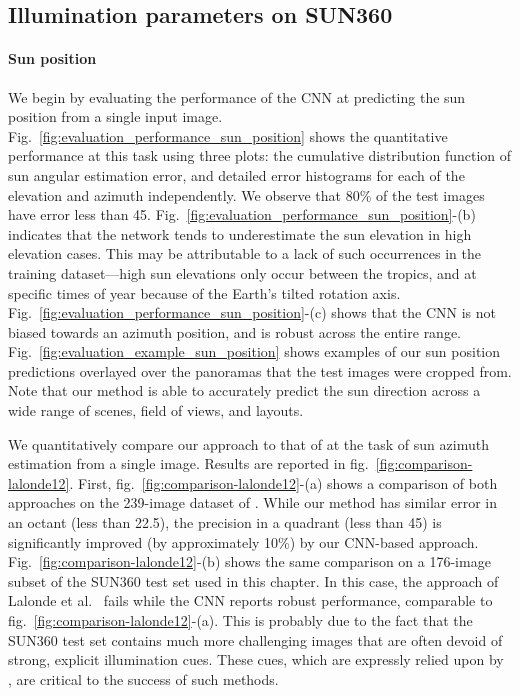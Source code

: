 \subsection{Illumination parameters on SUN360}

\paragraph{Sun position}

We begin by evaluating the performance of the CNN at predicting the sun position from a single input image. Fig.~\ref{fig:evaluation_performance_sun_position} shows the quantitative performance at this task using three plots: the cumulative distribution function of sun angular estimation error, and detailed error histograms for each of the elevation and azimuth independently. We observe that 80\% of the test images have error less than 45\degree. Fig.~\ref{fig:evaluation_performance_sun_position}-(b) indicates that the network tends to underestimate the sun elevation in high elevation cases. This may be attributable to a lack of such occurrences in the training dataset---high sun elevations only occur between the tropics, and at specific times of year because of the Earth's tilted rotation axis. Fig.~\ref{fig:evaluation_performance_sun_position}-(c) shows that the CNN is not biased towards an azimuth position, and is robust across the entire range. Fig.~\ref{fig:evaluation_example_sun_position} shows examples of our sun position predictions overlayed over the panoramas that the test images were cropped from. Note that our method is able to accurately predict the sun direction across a wide range of scenes, field of views, and layouts.

We quantitatively compare our approach to that of \cite{lalonde-ijcv-12} at the task of sun azimuth estimation from a single image. Results are reported in fig.~\ref{fig:comparison-lalonde12}. First, fig.~\ref{fig:comparison-lalonde12}-(a) shows a comparison of both approaches on the 239-image dataset of \cite{lalonde-ijcv-12}. While our method has similar error in an octant (less than 22.5\degree), the precision in a quadrant (less than 45\degree) is significantly improved (by approximately 10\%) by our CNN-based approach. Fig.~\ref{fig:comparison-lalonde12}-(b) shows the same comparison on a 176-image subset of the SUN360 test set used in this chapter. In this case, the approach of Lalonde et al.~\cite{lalonde-ijcv-12} fails while the CNN reports robust performance, comparable to fig.~\ref{fig:comparison-lalonde12}-(a). This is probably due to the fact that the SUN360 test set contains much more challenging images that are often devoid of strong, explicit illumination cues. These cues, which are expressly relied upon by \cite{lalonde-ijcv-12}, are critical to the success of such methods.
\vspace{-1.5em}
